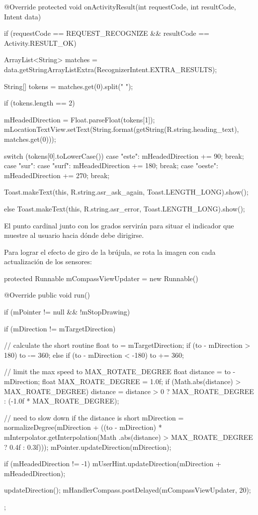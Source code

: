 \documentclass[	DIV=calc,%
							paper=a4,%
							fontsize=11pt]{scrartcl}	 					%
\begin{document}
\begin{javacode}
	@Override
	protected void onActivityResult(int requestCode, int resultCode, Intent data) {
			if (requestCode == REQUEST_RECOGNIZE &&
							resultCode == Activity.RESULT_OK) {
					ArrayList<String> matches =
									data.getStringArrayListExtra(RecognizerIntent.EXTRA_RESULTS);

					String[] tokens = matches.get(0).split(" ");

					if (tokens.length == 2) {
							mHeadedDirection = Float.parseFloat(tokens[1]);
							mLocationTextView.setText(String.format(getString(R.string.heading_text), matches.get(0)));

							switch (tokens[0].toLowerCase()) {
									case "este":
											mHeadedDirection += 90;
											break;
									case "sur":
									case "surf":
											mHeadedDirection += 180;
											break;
									case "oeste":
											mHeadedDirection += 270;
											break;
							}

							Toast.makeText(this, R.string.asr_ask_again,
											Toast.LENGTH_LONG).show();

					} else {
							Toast.makeText(this, R.string.asr_error,
											Toast.LENGTH_LONG).show();
					}
			}
	}
\end{javacode}

El punto cardinal junto con los grados servirán para situar el indicador
que muestre al usuario hacia dónde debe dirigirse.

Para lograr el efecto de giro de la brújula, se rota la imagen con cada
actualización de los sensores:

\begin{javacode}
	protected Runnable mCompassViewUpdater = new Runnable() {
			@Override
			public void run() {
					if (mPointer != null && !mStopDrawing) {
							if (mDirection != mTargetDirection) {

									// calculate the short routine
									float to = mTargetDirection;
									if (to - mDirection > 180) {
											to -= 360;
									} else if (to - mDirection < -180) {
											to += 360;
									}

									// limit the max speed to MAX_ROTATE_DEGREE
									float distance = to - mDirection;
									float MAX_ROATE_DEGREE = 1.0f;
									if (Math.abs(distance) > MAX_ROATE_DEGREE) {
											distance = distance > 0 ? MAX_ROATE_DEGREE : (-1.0f * MAX_ROATE_DEGREE);
									}

									// need to slow down if the distance is short
									mDirection = normalizeDegree(mDirection
													+ ((to - mDirection) * mInterpolator.getInterpolation(Math
													.abs(distance) > MAX_ROATE_DEGREE ? 0.4f : 0.3f)));
									mPointer.updateDirection(mDirection);

									if (mHeadedDirection != -1) {
											mUserHint.updateDirection(mDirection + mHeadedDirection);
									}
							}
							updateDirection();
							mHandlerCompass.postDelayed(mCompassViewUpdater, 20);
					}
			}
	};
\end{javacode}
\end{document}
